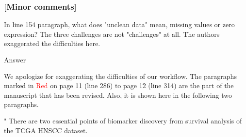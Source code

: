 \documentclass[preprint,12pt]{elsarticle}
\newenvironment{MyIndent}
{\par\leftskip1cm\relax\rightskip1cm\relax}
{\par\leftskip0cm\relax\rightskip0cm\relax}
\newenvironment{MyColorPar}[1]{%
    \leavevmode\color{#1}\ignorespaces%
}{%
}%
\begin{document}
\begin{MyColorPar}{blue}
\begin{MyIndent}
\begin{MyColorPar}{red}






%


\end{MyColorPar} %
\end{MyIndent}

\begin{MyColorPar}{black} %
\subsubsection*{[Minor comments]}

In line 154 paragraph, what does "unclean data" mean, missing values or zero expression? 
The three challenges are not "challenges" at all. The authors exaggerated the difficulties here.\\[0.3cm]
\end{MyColorPar}

Answer

We apologize for exaggerating the difficulties of our workflow.
The paragraphs marked in \textcolor{red}{Red} on page 11 (line 286) to page 12 (line 314) are the part of the manuscript that has been revised. Also, it is shown here in the following two paragraphs.


\begin{MyIndent}
\begin{MyColorPar}{red}
"
There are two essential points of biomarker discovery from survival analysis of the TCGA HNSCC dataset.


\end{MyColorPar}
\end{MyIndent}
\end{MyColorPar}
\end{document}
